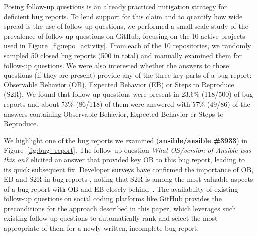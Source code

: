 Posing follow-up questions is an already practiced mitigation strategy for deficient bug
reports. To lend support for this claim and to quantify how wide spread is the use of
follow-up questions, we performed a small scale study of the prevalence
of follow-up questions on GitHub, focusing on the 10 active projects used in Figure~\ref{fig:repo_activity}.
From each of the 10 repositories, we randomly sampled 50 closed bug reports (500 in total) and manually examined them
for follow-up questions. We were also interested whether the answers to those questions (if they are present) provide any
of the three key parts of a bug report: Observable Behavior (OB), Expected Behavior (EB) or Steps to Reproduce (S2R).
We found that follow-up questions were present in 23.6\% (118/500) of bug reports and about 73\% (86/118) of them were
answered with 57\% (49/86) of the answers containing Observable Behavior, Expected Behavior or Steps to Reproduce.

We highlight one of the bug reports we examined ({\bf ansible/ansible \#3933}) in Figure~\ref{fig:bug_report}. The follow-up question {\em What OS/version of
Ansible was this on?} elicited an answer that provided key OB to this bug report, leading to its quick subsequent fix.
Developer surveys have confirmed the importance of OB, EB and S2R in bug reports , noting that S2R is among the most valuable aspects of a bug report
with OB and EB closely behind~\cite{zimmermann10whatmakes,laukkanen2011survey}. The availability of existing follow-up questions on social coding platforms like GitHub provides the preconditions for the approach described in this paper, which leverages such existing follow-up questions
to automatically rank and select the most appropriate of them for a newly written, incomplete bug report.
